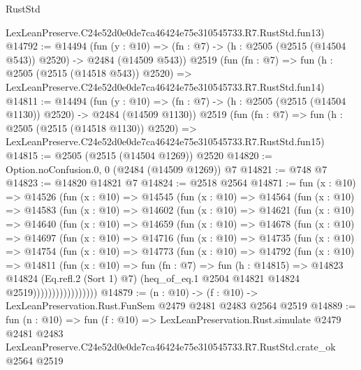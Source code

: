 \begin{lexlean}{RustStd}
\begin{coremodule}
    LexLeanPreserve.C24e52d0e0de7ca46424e75e310545733.R7.RustStd.fun13)
@14792 := @14494
    (fun (y : @10) => (fn : @7) -> (h : @2505 (@2515 (@14504 @543)) @2520) -> @2484 (@14509 @543))
    @2519
    (fun (fn : @7) =>
    fun (h : @2505 (@2515 (@14518 @543)) @2520) =>
    LexLeanPreserve.C24e52d0e0de7ca46424e75e310545733.R7.RustStd.fun14)
@14811 := @14494
    (fun (y : @10) => (fn : @7) -> (h : @2505 (@2515 (@14504 @1130)) @2520) -> @2484 (@14509 @1130))
    @2519
    (fun (fn : @7) =>
    fun (h : @2505 (@2515 (@14518 @1130)) @2520) =>
    LexLeanPreserve.C24e52d0e0de7ca46424e75e310545733.R7.RustStd.fun15)
@14815 := @2505 (@2515 (@14504 @1269)) @2520
@14820 := Option.noConfusion.{0, 0} (@2484 (@14509 @1269)) @7
@14821 := @748 @7
@14823 := @14820 @14821 @7
@14824 := @2518 @2564
@14871 := fun (x : @10) =>
  @14526
    (fun (x : @10) =>
    @14545
      (fun (x : @10) =>
      @14564
        (fun (x : @10) =>
        @14583
          (fun (x : @10) =>
          @14602
            (fun (x : @10) =>
            @14621
              (fun (x : @10) =>
              @14640
                (fun (x : @10) =>
                @14659
                  (fun (x : @10) =>
                  @14678
                    (fun (x : @10) =>
                    @14697
                      (fun (x : @10) =>
                      @14716
                        (fun (x : @10) =>
                        @14735
                          (fun (x : @10) =>
                          @14754
                            (fun (x : @10) =>
                            @14773
                              (fun (x : @10) =>
                              @14792
                                (fun (x : @10) =>
                                @14811
                                  (fun (x : @10) =>
                                  fun (fn : @7) =>
                                  fun (h : @14815) =>
                                  @14823
                                    @14824
                                    (Eq.refl.{2} (Sort 1) @7)
                                    (heq_of_eq.{1} @2504 @14821 @14824 @2519)))))))))))))))))
@14879 := (n : @10) -> (f : @10) -> LexLeanPreservation.Rust.FunSem @2479 @2481 @2483 @2564 @2519
@14889 := fun (n : @10) =>
  fun (f : @10) =>
  LexLeanPreservation.Rust.simulate
    @2479
    @2481
    @2483
    LexLeanPreserve.C24e52d0e0de7ca46424e75e310545733.R7.RustStd.crate_ok
    @2564
    @2519
\end{coremodule}
\end{lexlean}
